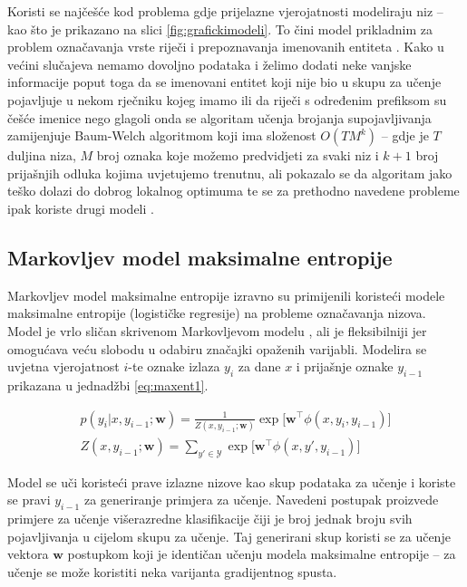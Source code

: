 Koristi se najčešće kod problema gdje prijelazne vjerojatnosti modeliraju niz --
kao što je prikazano na slici \ref{fig:grafickimodeli}. To čini model prikladnim
za problem označavanja vrste riječi \citep{halacsy2007hunpos} i prepoznavanja
imenovanih entiteta \citep{zhou2002named}. Kako u većini slučajeva nemamo
dovoljno podataka i želimo dodati neke vanjske informacije poput toga da se
imenovani entitet koji nije bio u skupu za učenje pojavljuje u nekom rječniku
kojeg imamo ili da riječi s određenim prefiksom su češće imenice nego glagoli
onda se algoritam učenja brojanja supojavljivanja zamijenjuje Baum-Welch
algoritmom koji ima složenost $O(T M ^ k)$ -- gdje je $T$ duljina niza, $M$ broj
oznaka koje možemo predvidjeti za svaki niz i $k+1$ broj prijašnjih odluka
kojima uvjetujemo trenutnu, ali pokazalo se da algoritam jako teško dolazi do
dobrog lokalnog optimuma te se za prethodno navedene probleme ipak koriste drugi
modeli \citep{johnson2007doesn}.

\subsection{Markovljev model maksimalne entropije}

Markovljev model maksimalne entropije 
izravno su primijenili \citet*{mccallum2000maximum} koristeći modele maksimalne
entropije (logističke regresije) na probleme označavanja nizova. Model je vrlo
sličan skrivenom Markovljevom modelu , ali je
fleksibilniji jer omogućava veću slobodu u odabiru značajki opaženih varijabli.
Modelira se uvjetna vjerojatnost $i$-te oznake izlaza $y_i$ za dane $x$ i
prijašnje oznake $y_{i-1}$ prikazana u jednadžbi \ref{eq:maxent1}.

\begin{equation}\label{eq:maxent1}
\begin{aligned}
  p(y_i | x, y_{i-1}; \mathbf{w}) = \frac{1}{Z(x, y_{i-1}; \mathbf{w})} \exp \big[ \mathbf{w}^\top \phi(x, y_i, y_{i-1})\big] \\
  Z(x, y_{i-1}; \mathbf{w}) = \sum_{y' \in \mathcal{Y}} \exp \big[ \mathbf{w}^\top \phi(x, y', y_{i-1})\big]
\end{aligned}
\end{equation}

Model se uči koristeći prave izlazne nizove kao skup podataka za učenje i
koriste se pravi $y_{i-1}$ za generiranje primjera za učenje. Navedeni postupak
proizvede primjere za učenje višerazredne klasifikacije čiji je broj jednak
broju svih pojavljivanja u cijelom skupu za učenje. Taj generirani skup koristi
se za učenje vektora $\mathbf{w}$ postupkom koji je identičan učenju modela
maksimalne entropije -- za učenje se može koristiti neka varijanta gradijentnog
spusta.

